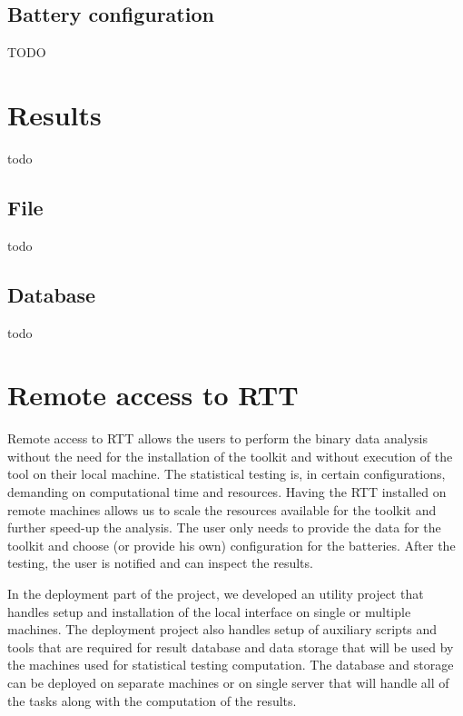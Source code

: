 \documentclass[
  digital,  	%
  color,		%
  oneside,   	%
  12pt,
  nocover,
  notable,
  nolof,
  nolot,
]{fithesis3}
\begin{document}
\subsection{Battery configuration}
\begin{huge}
TODO
\end{huge}

\section{Results}
\label{sec:result-storages}
\begin{huge}
todo
\end{huge}

\subsection{File}
\begin{huge}
todo
\end{huge}

\subsection{Database}
\begin{huge}
todo
\end{huge}


\section{Remote access to RTT}
Remote access to RTT allows the users to perform the binary data analysis without the need for the installation of the toolkit and without execution of the tool on their local machine. The statistical testing is, in certain configurations, demanding on computational time and resources. Having the RTT installed on remote machines allows us to scale the resources available for the toolkit and further speed-up the analysis. The user only needs to provide the data for the toolkit and choose (or provide his own) configuration for the batteries. After the testing, the user is notified and can inspect the results.

In the deployment part of the project, we developed an utility project that handles setup and installation of the local interface on single or multiple machines. The deployment project also handles setup of auxiliary scripts and tools that are required for result database and data storage that will be used by the machines used for statistical testing computation. The database and storage can be deployed on separate machines or on single server that will handle all of the tasks along with the computation of the results. 
\end{document}

